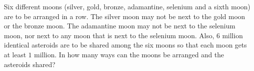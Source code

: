 Six different moons (silver, gold, bronze, adamantine, selenium and a sixth moon) are to be arranged in a row. The silver moon may not be next to the gold moon or the bronze moon. The adamantine moon may not be next to the selenium moon, nor next to any moon that is next to the selenium moon. Also, $6$ million identical asteroids are to be shared among the six moons so that each moon gets at least $1$ million. In how many ways can the moons be arranged and the asteroids shared?
